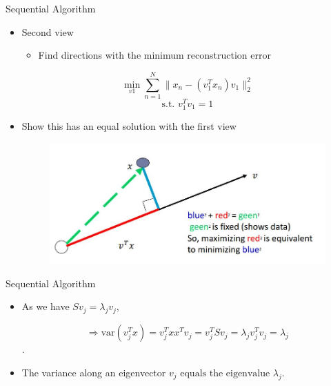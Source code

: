 \documentclass[serif, aspectratio=169]{beamer}
\begin{document}
\begin{frame}{Sequential Algorithm}
    \begin{itemize}
        \item Second view
        \begin{itemize}
            \item Find directions with the minimum reconstruction error 
        \end{itemize}
        $$
        \min_{v1} \sum_{n=1}^{N} \lVert x_n - (v_{1}^{T} x_n)v_{1} \rVert_2^{2}
        $$
        $$ \text{s.t. } v_1^{T}{v_1}  = 1$$
        \item Show this has an equal solution with the first view

        \begin{figure}[htpb]
            \begin{center}
                \includegraphics[keepaspectratio, scale=0.55]{pic/var_vs_rec.JPG}
            \end{center}
        \end{figure}

    \end{itemize}
\end{frame}


\begin{frame}{Sequential Algorithm}
    \begin{itemize}
       \item As we have $S v_j = \lambda_j v_j$,

    $$\Rightarrow \text{var}(v_j^T x) = v_j^T x x^{T} v_j =
       v_j^T S v_j =
       \lambda_j v_j^T v_j =
       \lambda_j$$.
    
    \item The variance along an eigenvector  $v_j \text{ equals the eigenvalue } \lambda_j. $
        
    \end{itemize}
\end{frame}
\end{document}
